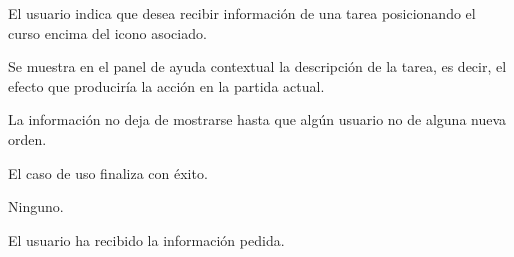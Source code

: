 {
  \item El usuario indica que desea recibir información de una tarea posicionando el curso encima del icono asociado.
  \item Se muestra en el panel de ayuda contextual la descripción de la tarea, es decir, el efecto que produciría la acción en la partida actual.
  \item La información no deja de mostrarse hasta que algún usuario no de alguna nueva orden.
  \item El caso de uso finaliza con éxito.
}
{
\item Ninguno.
}
{El usuario ha recibido la información pedida.}
